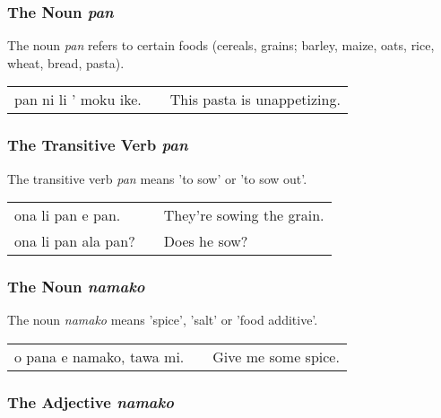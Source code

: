 \subsubsection*{The Noun \textit{pan}}
%

The noun \textit{pan} refers to certain foods (cereals, grains; barley, maize, oats, rice, wheat, bread, pasta). 

\begin{supertabular}{p{5,5cm}|ll}
pan ni li ' moku ike. && This pasta is unappetizing. \\
\end{supertabular} 

%
%
\subsubsection*{The Transitive Verb \textit{pan}}
%

The transitive verb \textit{pan} means 'to sow' or 'to sow out'.

\begin{supertabular}{p{5,5cm}|ll}
ona li pan e pan. && They're sowing the grain. \\
ona li pan ala pan? && Does he sow? \\
\end{supertabular} 

%
%
\subsubsection*{The Noun \textit{namako}}
%

The noun \textit{namako} means 'spice', 'salt' or 'food additive'.

\begin{supertabular}{p{5,5cm}|ll}
o pana e namako, tawa mi. &&  Give me some spice. \\
\end{supertabular} 

%
%
\subsubsection*{The Adjective \textit{namako}}
%

